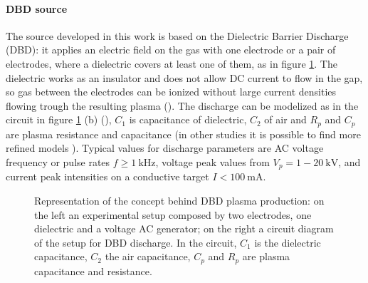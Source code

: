 \paragraph{DBD source}
The source developed in this work is based on the Dielectric Barrier Discharge (DBD): it applies an electric field on the gas with one electrode or a pair of electrodes, where a dielectric covers at least one of them, as in figure \ref{fig:DBDex}.
The dielectric works as an insulator and does not allow DC current to flow in the gap, so gas between the electrodes can be ionized without large current densities flowing trough the resulting plasma (\cite{Kogelschatz2003}). The discharge can be modelized as in the circuit in figure \ref{fig:DBDex} (b) (\cite{DBDcircuit}), $C_1$ is capacitance of dielectric, $C_2$ of air and $R_p$ and $C_p$ are plasma resistance and capacitance (in other studies it is possible to find more refined models \cite{doi:10.1063/1.4986023}). Typical values for discharge parameters are AC voltage frequency or pulse rates $f \ge \SI{1}{\kilo\hertz}$, voltage peak values from $V_{p} = 1 - \SI{20}{\kilo\volt}$, and current peak intensities on a conductive target $I < \SI{100}{\milli\ampere}$.
\begin{figure}
 \centering
 \hfill
 \caption{Representation of the concept behind DBD plasma production: on the left  an experimental setup composed by two electrodes, one dielectric and a voltage AC generator; on the right a circuit diagram of the setup for DBD discharge. In the circuit, $C_1$ is the dielectric capacitance, $C_2$ the air capacitance, $C_p$ and $R_p$ are plasma capacitance and resistance.}
 \label{fig:DBDex}
\end{figure}

